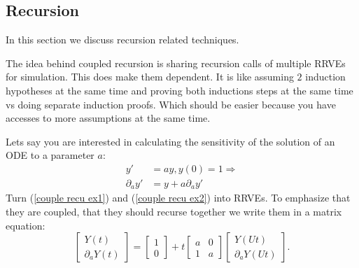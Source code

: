 \documentclass[a4paper,12pt]{article}
\begin{document}
\subsection{Recursion}
In this section we discuss recursion related techniques.

\begin{technique}
    The idea behind coupled recursion is sharing recursion calls of
    multiple RRVEs for simulation. This does make them dependent.
    It is like assuming $2$ induction hypotheses at the same
    time and proving both inductions steps at the same time vs
    doing separate induction proofs. Which should be easier
    because you have accesses to more assumptions at the same time.
\end{technique}

\begin{example}
    Lets say you are interested in calculating the
    sensitivity of the solution of an ODE to a
    parameter $a$:
    \begin{align}
        y'             & =ay,y(0)=1 \Rightarrow \label{couple recu ex1} \\
        \partial_{a}y' & = y + a \partial_{a}y' \label{couple recu ex2}
    \end{align}
    Turn (\ref{couple recu ex1}) and (\ref{couple recu ex2}) into RRVEs.
    To emphasize that they are coupled, that they should
    recurse together we write them in a matrix equation:
    \begin{equation} \label{coupled mat}
        \begin{bmatrix}
            Y(t) \\
            \partial_{a}Y(t)
        \end{bmatrix}=
        \begin{bmatrix}
            1 \\
            0
        \end{bmatrix}+
        t \begin{bmatrix}
            a & 0 \\
            1 & a
        \end{bmatrix}
        \begin{bmatrix}
            Y(Ut) \\
            \partial_{a}Y(Ut)
        \end{bmatrix}.
    \end{equation}

\end{example}
\end{document}
